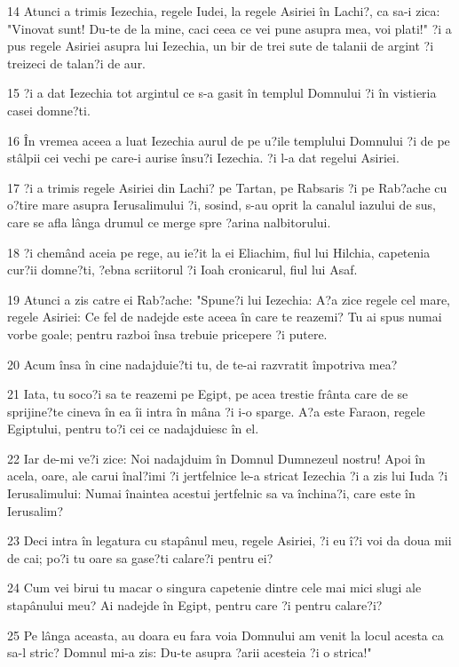 \par 14 Atunci a trimis Iezechia, regele Iudei, la regele Asiriei în Lachi?, ca sa-i zica: "Vinovat sunt! Du-te de la mine, caci ceea ce vei pune asupra mea, voi plati!" ?i a pus regele Asiriei asupra lui Iezechia, un bir de trei sute de talanii de argint ?i treizeci de talan?i de aur.
\par 15 ?i a dat Iezechia tot argintul ce s-a gasit în templul Domnului ?i în vistieria casei domne?ti.
\par 16 În vremea aceea a luat Iezechia aurul de pe u?ile templului Domnului ?i de pe stâlpii cei vechi pe care-i aurise însu?i Iezechia. ?i l-a dat regelui Asiriei.
\par 17 ?i a trimis regele Asiriei din Lachi? pe Tartan, pe Rabsaris ?i pe Rab?ache cu o?tire mare asupra Ierusalimului ?i, sosind, s-au oprit la canalul iazului de sus, care se afla lânga drumul ce merge spre ?arina nalbitorului.
\par 18 ?i chemând aceia pe rege, au ie?it la ei Eliachim, fiul lui Hilchia, capetenia cur?ii domne?ti, ?ebna scriitorul ?i Ioah cronicarul, fiul lui Asaf.
\par 19 Atunci a zis catre ei Rab?ache: "Spune?i lui Iezechia: A?a zice regele cel mare, regele Asiriei: Ce fel de nadejde este aceea în care te reazemi? Tu ai spus numai vorbe goale; pentru razboi însa trebuie pricepere ?i putere.
\par 20 Acum însa în cine nadajduie?ti tu, de te-ai razvratit împotriva mea?
\par 21 Iata, tu soco?i sa te reazemi pe Egipt, pe acea trestie frânta care de se sprijine?te cineva în ea îi intra în mâna ?i i-o sparge. A?a este Faraon, regele Egiptului, pentru to?i cei ce nadajduiesc în el.
\par 22 Iar de-mi ve?i zice: Noi nadajduim în Domnul Dumnezeul nostru! Apoi în acela, oare, ale carui înal?imi ?i jertfelnice le-a stricat Iezechia ?i a zis lui Iuda ?i Ierusalimului: Numai înaintea acestui jertfelnic sa va închina?i, care este în Ierusalim?
\par 23 Deci intra în legatura cu stapânul meu, regele Asiriei, ?i eu î?i voi da doua mii de cai; po?i tu oare sa gase?ti calare?i pentru ei?
\par 24 Cum vei birui tu macar o singura capetenie dintre cele mai mici slugi ale stapânului meu? Ai nadejde în Egipt, pentru care ?i pentru calare?i?
\par 25 Pe lânga aceasta, au doara eu fara voia Domnului am venit la locul acesta ca sa-l stric? Domnul mi-a zis: Du-te asupra ?arii acesteia ?i o strica!"
